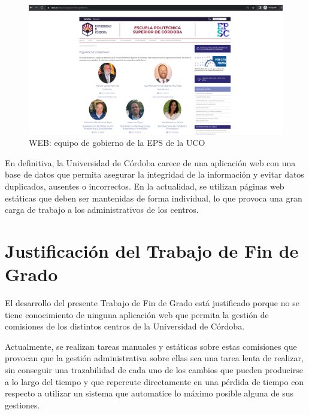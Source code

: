 \begin{figure}[H]
    \centering
    \includegraphics[scale=0.4]{img/capturas/WebEquipoGobiernoEPSUCO.png}
    \caption{WEB: equipo de gobierno de la EPS de la UCO}
    \label{fig:PACE-WebEquipoGobiernoEPSUCO}
\end{figure}

En definitiva, la Universidad de Córdoba carece de una aplicación web con una base de datos que permita asegurar la integridad de la información y evitar datos duplicados, ausentes o incorrectos. En la actualidad, se utilizan páginas web estáticas que deben ser mantenidas de forma individual, lo que provoca una gran carga de trabajo a los administrativos de los centros.

\section{Justificación del Trabajo de Fin de Grado}

El desarrollo del presente Trabajo de Fin de Grado está justificado porque no se tiene conocimiento de ninguna aplicación web que permita la gestión de comisiones de los distintos centros de la Universidad de Córdoba.

Actualmente, se realizan tareas manuales y estáticas sobre estas comisiones que provocan que la gestión administrativa sobre ellas sea una tarea lenta de realizar, sin conseguir una trazabilidad de cada uno de los cambios que pueden producirse a lo largo del tiempo y que repercute directamente en una pérdida de tiempo con respecto a utilizar un sistema que automatice lo máximo posible alguna de sus gestiones.
